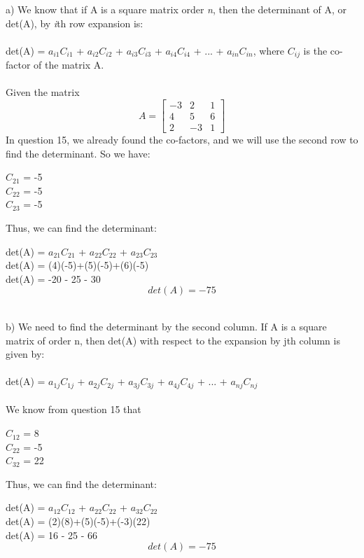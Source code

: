\documentclass[12pt,a4paper]{extarticle}
\begin{document}
a) We know that if A is a square matrix order \textit{n}, then the determinant of A, or det(A), by \textit{i}th row expansion is:
\\
\\
det(A) = $a_{i1}$$C_{i1}$ + $a_{i2}$$C_{i2}$ + $a_{i3}$$C_{i3}$ + $a_{i4}$$C_{i4}$ + ... + $a_{in}$$C_{in}$, where $C_{ij}$ is the co-factor of the matrix A.
\\
\\
Given the matrix
\[
	A = \begin{bmatrix}
		-3 & 2 & 1 \\
		4 & 5 & 6 \\
		2 & -3 & 1
	\end{bmatrix}
\]
In question 15, we already found the co-factors, and we will use
the second row to find the determinant. So we have:
\begin{center}
$C_{21}$ = -5 \\
$C_{22}$ = -5 \\
$C_{23}$ = -5
\end{center}
Thus, we can find the determinant:
\begin{center}
det(A) = $a_{21}$$C_{21}$ + $a_{22}$$C_{22}$ + $a_{23}$$C_{23}$\\
det(A) = (4)(-5)+(5)(-5)+(6)(-5) \\
det(A) = -20 - 25 - 30
\[
\boxed{det(A) = -75}
\]
\end{center}
\\
b) We need to find the determinant by the second column. If A is a square matrix of order n, then det(A) with respect to the expansion by jth column is given by:
\\
\\
det(A) = $a_{1j}$$C_{1j}$ + $a_{2j}$$C_{2j}$ + $a_{3j}$$C_{3j}$ + $a_{4j}$$C_{4j}$ + ... + $a_{nj}$$C_{nj}$
\\
\\
We know from question 15 that
\begin{center}
$C_{12}$ = 8 \\
$C_{22}$ = -5 \\
$C_{32}$ = 22
\end{center}
Thus, we can find the determinant:
\begin{center}
det(A) = $a_{12}$$C_{12}$ + $a_{22}$$C_{22}$ + $a_{32}$$C_{22}$\\
det(A) = (2)(8)+(5)(-5)+(-3)(22) \\
det(A) = 16 - 25 - 66
\[
\boxed{det(A) = -75}
\]
\end{center}
\newpage
\end{document}
